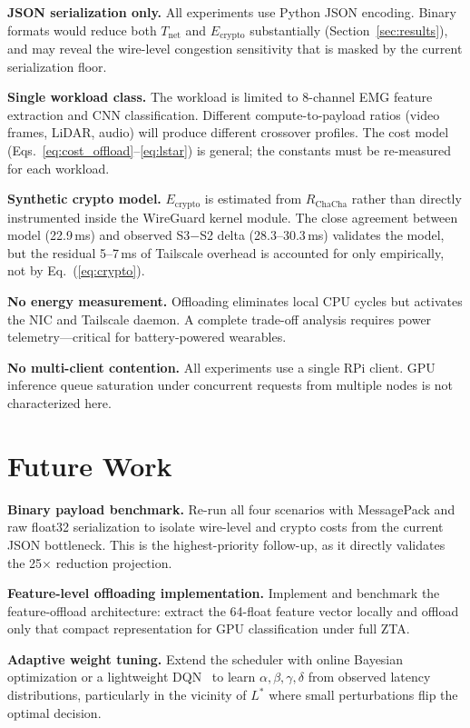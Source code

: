 \documentclass[10pt,twocolumn]{article}
\begin{document}
\textbf{JSON serialization only.}  All experiments use Python JSON encoding.
Binary formats would reduce both $T_{\text{net}}$ and $E_{\text{crypto}}$
substantially (Section~\ref{sec:results}), and may reveal the wire-level
congestion sensitivity that is masked by the current serialization floor.

\textbf{Single workload class.}  The workload is limited to 8-channel EMG
feature extraction and CNN classification.  Different compute-to-payload
ratios (video frames, LiDAR, audio) will produce different crossover profiles.
The cost model (Eqs.~\ref{eq:cost_offload}--\ref{eq:lstar}) is general;
the constants must be re-measured for each workload.

\textbf{Synthetic crypto model.}  $E_{\text{crypto}}$ is estimated from
$R_{\text{ChaCha}}$ rather than directly instrumented inside the WireGuard
kernel module.  The close agreement between model (22.9\,ms) and observed
S3$-$S2 delta (28.3--30.3\,ms) validates the model, but the residual
5--7\,ms of Tailscale overhead is accounted for only empirically, not by
Eq.~(\ref{eq:crypto}).

\textbf{No energy measurement.}  Offloading eliminates local CPU cycles
but activates the NIC and Tailscale daemon.  A complete trade-off analysis
requires power telemetry—critical for battery-powered wearables.

\textbf{No multi-client contention.}  All experiments use a single RPi
client.  GPU inference queue saturation under concurrent requests from
multiple nodes is not characterized here.

\section{Future Work}

\textbf{Binary payload benchmark.}
Re-run all four scenarios with MessagePack and raw float32 serialization to
isolate wire-level and crypto costs from the current JSON bottleneck.
This is the highest-priority follow-up, as it directly validates the 25$\times$
reduction projection.

\textbf{Feature-level offloading implementation.}
Implement and benchmark the feature-offload architecture: extract the 64-float
feature vector locally and offload only that compact representation for GPU
classification under full ZTA.

\textbf{Adaptive weight tuning.}
Extend the scheduler with online Bayesian optimization or a lightweight
DQN~\cite{wang2020fast} to learn $\alpha, \beta, \gamma, \delta$ from observed
latency distributions, particularly in the vicinity of $L^*$ where small
perturbations flip the optimal decision.
\end{document}
